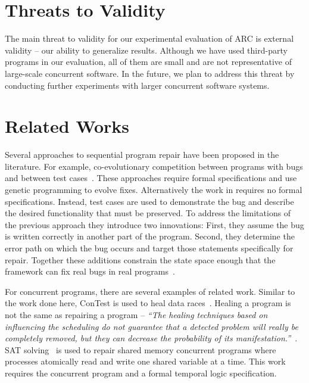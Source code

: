 \documentclass[runningheads,a4paper]{llncs}
\begin{document}
\section{Threats to Validity}
\label{sec:threats}

The main threat to validity for our experimental evaluation of ARC is external validity -- our ability to generalize results. Although we have used third-party programs in our evaluation, all of them are small and are not representative of large-scale concurrent software. In the future, we plan to address this threat by conducting further experiments with larger concurrent software systems.

\section{Related Works}
\label{sec:related_works}

Several approaches to sequential program repair have been proposed in the literature. For example, co-evolutionary competition between programs with bugs and between test cases~\cite{AY08, Arc08, WT10}. These approaches require formal specifications and use genetic programming to evolve fixes. Alternatively the work in requires no formal specifications. Instead, test cases are used to demonstrate the bug and describe the desired functionality that must be preserved. To address the limitations of the previous approach they introduce two innovations: First, they assume the bug is written correctly in another part of the program. Second, they determine the error path on which the bug occurs and target those statements specifically for repair. Together these additions constrain the state space enough that the framework can fix real bugs in real programs~\cite{FNWG09, WNLF09, NWLF09, WFGN10, GNFW11, LDFW12}.

For concurrent programs, there are several examples of related work. Similar to the work done here, ConTest is used to heal data races~\cite{KLT+07, LVK08}. Healing a program is not the same as repairing a program -- \textit{``The healing techniques based on influencing the scheduling do not guarantee that a detected problem will really be completely removed, but they can decrease the probability of its manifestation.''}~\cite{LVK08}. SAT solving~\cite{AY07}  is used to repair shared memory concurrent programs where processes atomically read and write one shared variable at a time. This work requires the concurrent program and a formal temporal logic specification. 
\end{document}
